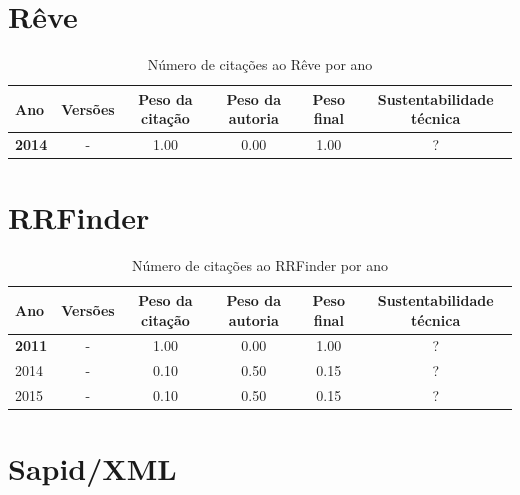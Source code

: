 


\section{Rêve}



\begin{table}[H]
\caption{Número de citações ao Rêve por ano}
\centering
\begin{tabular}{| l | c | c | c | c | c |}
  \hline
  Ano & Versões & Peso da citação & Peso da autoria & Peso final & Sustentabilidade técnica \\
  \hline
            {\bf 2014}
          &
          -
          &
          1.00
          &
          0.00
          &
            {\color{blue} 1.00}
          &
          ?
          \\
\hline
\end{tabular}
\end{table}



\section{RRFinder}



\begin{table}[H]
\caption{Número de citações ao RRFinder por ano}
\centering
\begin{tabular}{| l | c | c | c | c | c |}
  \hline
  Ano & Versões & Peso da citação & Peso da autoria & Peso final & Sustentabilidade técnica \\
  \hline
            {\bf 2011}
          &
          -
          &
          1.00
          &
          0.00
          &
            {\color{blue} 1.00}
          &
          ?
          \\
\hline
            2014
          &
          -
          &
          0.10
          &
          0.50
          &
            {\color{red} 0.15}
          &
          ?
          \\
\hline
            2015
          &
          -
          &
          0.10
          &
          0.50
          &
            {\color{red} 0.15}
          &
          ?
          \\
\hline
\end{tabular}
\end{table}



\section{Sapid/XML}



